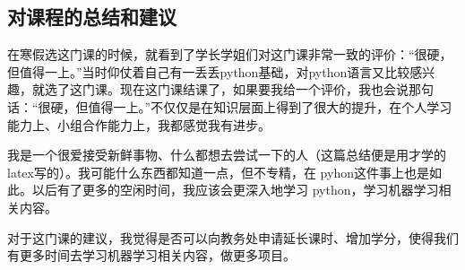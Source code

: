 \documentclass[UTF8]{ctexart}
\begin{document}
  \subsection{对课程的总结和建议}
  在寒假选这门课的时候，就看到了学长学姐们对这门课非常一致的评价：“很硬，但值得一上。”当时仰仗着自己有一丢丢python基础，对python语言又比较感兴趣，就选了这门课。现在这门课结课了，如果要我给一个评价，我也会说那句话：“很硬，但值得一上。”不仅仅是在知识层面上得到了很大的提升，在个人学习能力上、小组合作能力上，我都感觉我有进步。\par 
  我是一个很爱接受新鲜事物、什么都想去尝试一下的人（这篇总结便是用才学的 latex写的）。我可能什么东西都知道一点，但不专精，在 pyhon这件事上也是如此。以后有了更多的空闲时间，我应该会更深入地学习 python，学习机器学习相关内容。\par 
  对于这门课的建议，我觉得是否可以向教务处申请延长课时、增加学分，使得我们有更多时间去学习机器学习相关内容，做更多项目。
\end{document}
